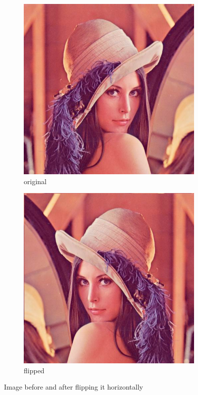 \documentclass[12pt]{article}
\begin{document}
\begin{figure}[H]\centering
    \begin{subfigure}[t]{\subfiguresize}\centering
        \includegraphics[width=\textwidth]{lenac.png}
        \caption{original}
    \end{subfigure}
    \hspace{.05\textwidth}
    \begin{subfigure}[t]{\subfiguresize}\centering
        \includegraphics[width=\textwidth]{lenac_hflip.png}
        \caption{flipped}
    \end{subfigure}
    \caption{Image before and after flipping it horizontally}
\end{figure}
\end{document}
